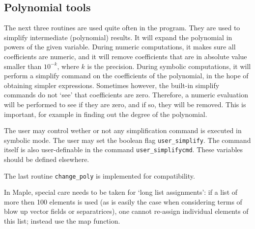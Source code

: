 \documentclass[a4paper,10pt]{article}
\begin{document}
\subsection{Polynomial tools}

The next three routines are used quite often in the program.  They are used to
simplify intermediate (polynomial) results.  It will expand the polynomial
in powers of the given variable.  During numeric computations, it
makes sure all coefficients are numeric, and it will remove coefficients that
are in absolute value smaller than $10^{-k}$, where $k$ is the precision.  During
symbolic computations, it will perform a simplify command on the coefficients
of the polynomial, in the hope of obtaining simpler expressions.  Sometimes however,
the built-in simplify commands do not `see' that coefficients are zero.  Therefore,
a numeric evaluation will be performed to see if they are zero, and if so, they will
be removed.  This is important, for example in finding out the degree of the polynomial.

The user may control wether or not any simplification command is executed in symbolic mode.
The user may set the boolean flag \verb+user_simplify+.  The command itself is also user-definable
in the command \verb+user_simplifycmd+.  These variables should be defined elsewhere.

The last routine \verb+change_poly+ is implemented for compatibility.

In Maple, special care needs to be taken for `long list assignments': if a list of more then 100
elements is used (as is easily the case when considering terms of blow up vector fields or separatrices),
one cannot re-assign individual elements of this list; instead use the map function.
\end{document}
